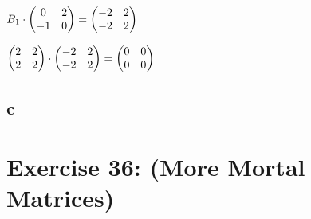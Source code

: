 \documentclass[12pt]{article}
\begin{document}
$B_1 \cdot 
\begin{pmatrix}
0 & 2 \\
-1 & 0 
\end{pmatrix} = 
\begin{pmatrix}
-2 & 2 \\
-2 & 2 
\end{pmatrix}\\
$ 

$
\begin{pmatrix}
2 & 2 \\
2 & 2 
\end{pmatrix} \cdot
\begin{pmatrix}
-2 & 2 \\
-2 & 2 
\end{pmatrix} =
\begin{pmatrix}
0 & 0 \\
0 & 0 
\end{pmatrix}\\
$


\subsection*{c}


\section*{Exercise 36: (More Mortal Matrices)}


\end{document}
